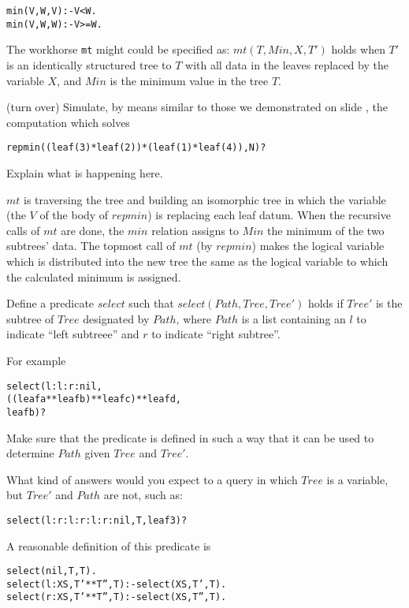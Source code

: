 \documentclass{popl}
\begin{document}
\begin{exercises}
\begin{ex}
\begin{alltt}
        min(V, W, V) :- V<W.
        min(V, W, W) :- V>=W.
\end{alltt}

The workhorse {\tt mt} might could be specified as: $mt(T, Min, X, T')$ holds
when $T'$ is an identically structured tree to $T$ with all data in the leaves 
replaced by the variable $X$, and $Min$ is the minimum value in the tree $T$.

(turn over)
\newpage
Simulate, by means similar to those we demonstrated on slide \pageref{appendtrace}, the
computation which solves 
\begin{alltt}
        repmin((leaf(3)*leaf(2))*(leaf(1)*leaf(4)), N)?
\end{alltt}

Explain what is happening here.

\begin{ans}
$mt$ is traversing the tree and building an isomorphic tree in 
which the variable (the $V$ of the body of $repmin$) is replacing
each leaf datum. When the recursive calls of $mt$ are done, the $min$
relation assigns to $Min$ the minimum of the two subtrees' data. The topmost
call of $mt$ (by $repmin$) makes the 
logical variable which is distributed into the new tree the same
as the logical variable to which the calculated minimum is assigned.
\end{ans}
\end{ex}

\begin{ex}
Define a predicate $select$ such that $select(Path, Tree, Tree')$ holds if
$Tree'$ is the subtree of $Tree$ designated by $Path$, where $Path$ is
a list containing an $l$ to indicate ``left subtreee'' and $r$ to 
indicate ``right subtree''.

For example
\begin{alltt}
        select(l:l:r:nil, 
               ((leaf a ** leaf b) ** leaf c) ** leaf d, 
               leaf b)?
\end{alltt}

Make sure that the predicate is defined in such a way that it can be
used to determine $Path$ given $Tree$ and $Tree'$.

What kind of answers would you expect to a query in which $Tree$ is a variable, but 
$Tree'$ and $Path$ are not, such as:
\begin{alltt}
        select(l:r:l:r:l:r:nil, T, leaf 3)?
\end{alltt}

\begin{ans}
A reasonable definition of this predicate is
\begin{alltt}
        select(nil, T, T).
        select(l:XS, T'**T'', T) :- select(XS, T', T).
        select(r:XS, T'**T'', T) :- select(XS, T'', T).
\end{alltt}


\end{ans}
\end{ex}
\end{exercises}
\end{document}
